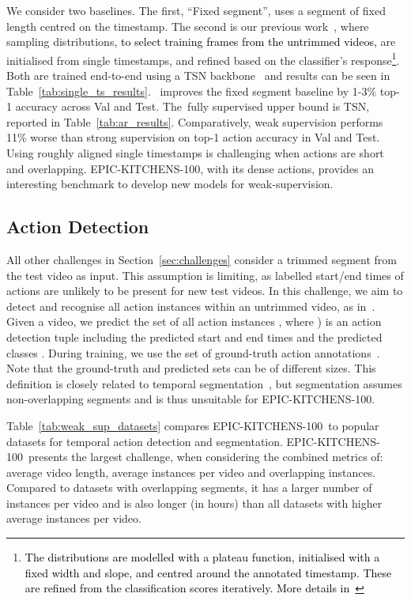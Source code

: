 \documentclass[twocolumn]{svjour3}          \smartqed
\newcommand{\chParagraph}[1]{\noindent {\textbf{#1.}} \hspace{6pt}}
\newcommand{\edits}[1]{\textcolor{black}{#1}}
\newcommand {\newDataset} {EPIC-KITCHENS-100}
\begin{document}
\chParagraph{Baselines and Results} 
We consider two baselines. 
The first, ``Fixed segment'', uses a segment of fixed length centred on the timestamp. 
The second is our previous work~\cite{Moltisanti_2019_CVPR}, where sampling distributions\edits{, to select training frames from the untrimmed videos,} are initialised from single timestamps, and refined based on the classifier's response\footnote{\edits{The distributions are modelled with a plateau function, initialised with a fixed width and slope, and centred around the annotated timestamp.
These are refined from the classification scores iteratively. More details in~\cite{Moltisanti_2019_CVPR}}}.
Both are trained end-to-end using a TSN backbone~\cite{wang2016tsn} and results can be seen in Table~\ref{tab:single_ts_results}. \cite{Moltisanti_2019_CVPR}~improves the fixed segment baseline by 1-3\% top-1 accuracy across Val and Test. The~fully supervised upper bound is TSN, reported in Table~\ref{tab:ar_results}. Comparatively, weak supervision performs 11\% worse than strong supervision on top-1 action accuracy in Val and Test. 
Using roughly aligned single timestamps is
challenging when actions are short and overlapping. 
\newDataset, with its dense actions, provides an interesting benchmark to develop new models for weak-supervision.

\subsection{Action Detection}
\label{sec:action_detection_challenge}


\chParagraph{Definition}
All other challenges in Section~\ref{sec:challenges} consider a trimmed segment  from the test video as input. This assumption is limiting, as labelled start/end times of actions are unlikely to be present for new test videos. In this challenge, we aim to detect and recognise all action instances within an untrimmed video, as in~\cite{caba2015activitynet}. 
Given a video, we predict the set of all action instances , where ) is an action detection tuple including the predicted start and end times  and the predicted classes . During training, we use the set of ground-truth action annotations~. Note that the ground-truth  and predicted  sets can be of different sizes.
This definition is closely related to temporal segmentation~\cite{lea2017temporal}, but segmentation assumes non-overlapping segments and is thus unsuitable for \newDataset{}.


\chParagraph{Related Datasets} 
Table~\ref{tab:weak_sup_datasets} compares \newDataset\ to popular datasets for temporal action detection and segmentation. 
\newDataset\ presents the largest challenge, when considering the combined metrics of: average video length, average instances per video and overlapping instances. 
Compared to datasets with overlapping segments, it has a larger number of instances per video and  is also longer (in hours) than all datasets with higher average instances per video.
\end{document}
